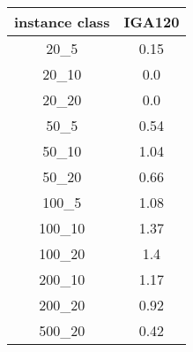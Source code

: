 \begin{tabular}{c|c|}
instance class & IGA120 \\ 
\hline
20_5         & 0.15         \\ 
20_10        & 0.0          \\ 
20_20        & 0.0          \\ 
50_5         & 0.54         \\ 
50_10        & 1.04         \\ 
50_20        & 0.66         \\ 
100_5        & 1.08         \\ 
100_10       & 1.37         \\ 
100_20       & 1.4          \\ 
200_10       & 1.17         \\ 
200_20       & 0.92         \\ 
500_20       & 0.42         \\ 
\end{tabular}